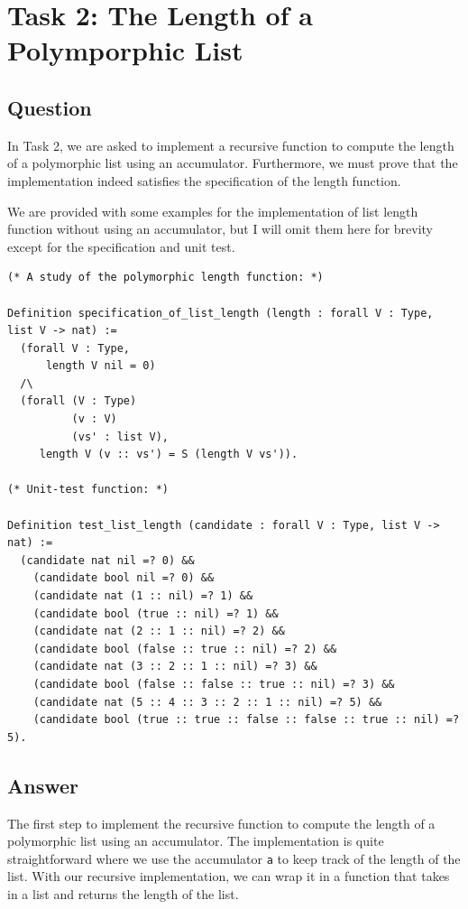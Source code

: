 \documentclass{article}
\begin{document}
\newpage

\section{Task 2: The Length of a Polymporphic List}

\subsection{Question}

In Task 2, we are asked to implement a recursive function to compute the length of a polymorphic list using an accumulator. Furthermore, we must prove that the implementation indeed satisfies the specification of the length function.

We are provided with some examples for the implementation of list length function without using an accumulator, but I will omit them here for brevity except for the specification and unit test. 

\begin{lstlisting}
(* A study of the polymorphic length function: *)

Definition specification_of_list_length (length : forall V : Type, list V -> nat) :=
  (forall V : Type,
      length V nil = 0)
  /\
  (forall (V : Type)
          (v : V)
          (vs' : list V),
     length V (v :: vs') = S (length V vs')).

(* Unit-test function: *)

Definition test_list_length (candidate : forall V : Type, list V -> nat) :=
  (candidate nat nil =? 0) &&
    (candidate bool nil =? 0) &&
    (candidate nat (1 :: nil) =? 1) &&
    (candidate bool (true :: nil) =? 1) &&
    (candidate nat (2 :: 1 :: nil) =? 2) &&
    (candidate bool (false :: true :: nil) =? 2) &&
    (candidate nat (3 :: 2 :: 1 :: nil) =? 3) &&
    (candidate bool (false :: false :: true :: nil) =? 3) &&
    (candidate nat (5 :: 4 :: 3 :: 2 :: 1 :: nil) =? 5) &&
    (candidate bool (true :: true :: false :: false :: true :: nil) =? 5).
\end{lstlisting}

\subsection{Answer}

The first step to implement the recursive function to compute the length of a polymorphic list using an accumulator. The implementation is quite straightforward where we use the accumulator \texttt{a} to keep track of the length of the list. With our recursive implementation, we can wrap it in a function that takes in a list and returns the length of the list.
\end{document}
